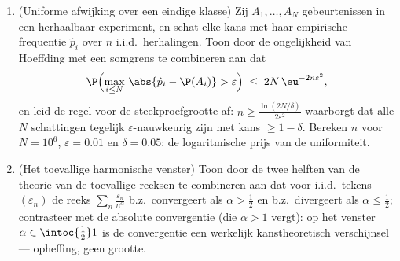 \begin{problem}
\begin{enumerate}[resume]
  \item (Uniforme afwijking over een eindige klasse) Zij $A_1,
        \dots, A_N$ gebeurtenissen in een herhaalbaar experiment,
        en schat elke kans met haar empirische frequentie $\hat
        p_i$ over $n$ i.i.d.\ herhalingen. Toon door de
        ongelijkheid van Hoeffding met een somgrens te combineren
        aan dat
        \[
        \P\Bigl(\max_{i\leq N}\,\abs{\hat p_i - \P(A_i)} >
        \varepsilon\Bigr) \;\leq\; 2N\,\eu^{-2n\varepsilon^2},
        \]
        en leid de regel voor de steekproefgrootte af: $n \geq
        \frac{\ln(2N/\delta)}{2\varepsilon^2}$ waarborgt dat alle
        $N$ schattingen tegelijk $\varepsilon$-nauwkeurig zijn
        met kans $\geq 1 - \delta$. Bereken $n$ voor $N = 10^6$,
        $\varepsilon = 0.01$ en $\delta = 0.05$: de logaritmische
        prijs van de uniformiteit.
  \item (Het toevallige harmonische venster) Toon door de twee
        helften van de theorie van de toevallige reeksen te
        combineren aan dat voor i.i.d.\ tekens $(\varepsilon_n)$
        de reeks $\sum_n\frac{\varepsilon_n}{n^\alpha}$ b.z.\
        convergeert als $\alpha > \frac12$ en b.z.\ divergeert
        als $\alpha \leq \frac12$; contrasteer met de absolute
        convergentie (die $\alpha > 1$ vergt): op het venster
        $\alpha \in \intoc{\frac12}1$ is de convergentie een
        werkelijk kanstheoretisch verschijnsel --- opheffing,
        geen grootte.
\end{enumerate}
\end{problem}
